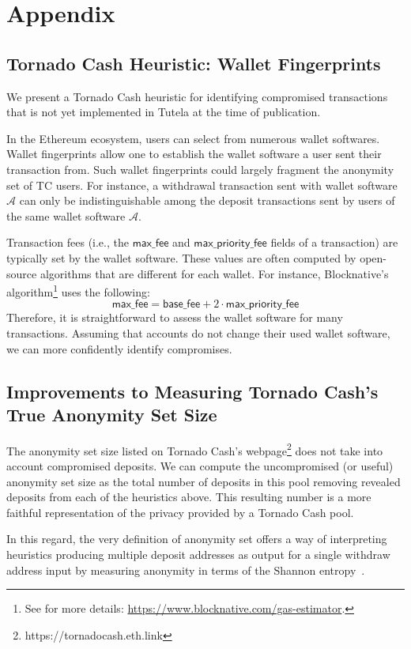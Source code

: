 \section{Appendix}

\subsection{Tornado Cash Heuristic: Wallet Fingerprints}
We present a Tornado Cash heuristic for identifying compromised transactions that is not yet implemented in Tutela at the time of publication.

In the Ethereum ecosystem, users can select from numerous wallet softwares. Wallet fingerprints allow one to establish the wallet software a user sent their transaction from. Such wallet fingerprints could largely fragment the anonymity set of TC users. For instance, a withdrawal transaction sent with wallet software $\mathcal{A}$ can only be indistinguishable among the deposit transactions sent by users of the same wallet software $\mathcal{A}$. 

Transaction fees (i.e., the $\mathsf{max\_fee}$ and $\mathsf{max\_priority\_fee}$ fields of a transaction) are typically set by the wallet software. These values are often computed by open-source algorithms that are different for each wallet. For instance, Blocknative's algorithm\footnote{See for more details: \url{https://www.blocknative.com/gas-estimator}.} uses the following: \[\mathsf{max\_fee}=\mathsf{base\_fee}+2\cdot\mathsf{max\_priority\_fee}\] Therefore, it is straightforward to assess the wallet software for many transactions. Assuming that accounts do not change their used wallet software, we can more confidently identify compromises.

\subsection{Improvements to Measuring Tornado Cash's True Anonymity Set Size}

The anonymity set size listed on Tornado Cash's webpage\footnote{https://tornadocash.eth.link} does not take into account compromised deposits. We can compute the uncompromised (or useful) anonymity set size as the total number of deposits in this pool removing revealed deposits from each of the heuristics above. This resulting number is a more faithful representation of the privacy provided by a Tornado Cash pool.

In this regard, the very definition of anonymity set offers a way of interpreting heuristics producing multiple deposit addresses as output for a single withdraw address input by measuring anonymity in terms of the Shannon entropy~\cite{diaz2002towards}. 

